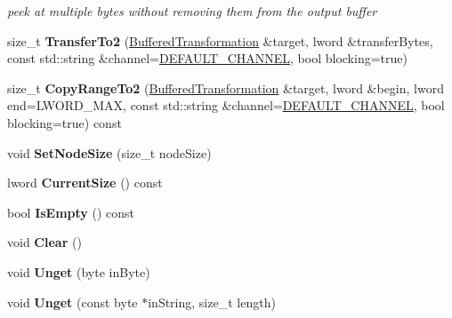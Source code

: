 \begin{DoxyCompactItemize}
\begin{DoxyCompactList}\small\item\em peek at multiple bytes without removing them from the output buffer \item\end{DoxyCompactList}\item 
\hypertarget{class_byte_queue_a9863db3b56bf42fb424f426afb7531cd}{
size\_\-t {\bfseries TransferTo2} (\hyperlink{class_buffered_transformation}{BufferedTransformation} \&target, lword \&transferBytes, const std::string \&channel=\hyperlink{cryptlib_8h_a6f1917f54ea8c2a45de6e08c5087c8de}{DEFAULT\_\-CHANNEL}, bool blocking=true)}
\label{class_byte_queue_a9863db3b56bf42fb424f426afb7531cd}

\item 
\hypertarget{class_byte_queue_a9a389914e2003ebb26516e4a6ad27c2c}{
size\_\-t {\bfseries CopyRangeTo2} (\hyperlink{class_buffered_transformation}{BufferedTransformation} \&target, lword \&begin, lword end=LWORD\_\-MAX, const std::string \&channel=\hyperlink{cryptlib_8h_a6f1917f54ea8c2a45de6e08c5087c8de}{DEFAULT\_\-CHANNEL}, bool blocking=true) const }
\label{class_byte_queue_a9a389914e2003ebb26516e4a6ad27c2c}

\item 
\hypertarget{class_byte_queue_a2e4f3d3759cf2ce54cbd1a193b1cefb6}{
void {\bfseries SetNodeSize} (size\_\-t nodeSize)}
\label{class_byte_queue_a2e4f3d3759cf2ce54cbd1a193b1cefb6}

\item 
\hypertarget{class_byte_queue_abe53cbc0c730b13c393e20ce6ccda577}{
lword {\bfseries CurrentSize} () const }
\label{class_byte_queue_abe53cbc0c730b13c393e20ce6ccda577}

\item 
\hypertarget{class_byte_queue_af44849c6d39bcdad5864dfd81ae5a122}{
bool {\bfseries IsEmpty} () const }
\label{class_byte_queue_af44849c6d39bcdad5864dfd81ae5a122}

\item 
\hypertarget{class_byte_queue_a2c305604a71571438aeb4c4e5e567c45}{
void {\bfseries Clear} ()}
\label{class_byte_queue_a2c305604a71571438aeb4c4e5e567c45}

\item 
\hypertarget{class_byte_queue_abdc94324169d07db16a246259c5ef86b}{
void {\bfseries Unget} (byte inByte)}
\label{class_byte_queue_abdc94324169d07db16a246259c5ef86b}

\item 
\hypertarget{class_byte_queue_a2d72210af03aea4ca132ed46d91b67e1}{
void {\bfseries Unget} (const byte $\ast$inString, size\_\-t length)}
\label{class_byte_queue_a2d72210af03aea4ca132ed46d91b67e1}


\end{DoxyCompactItemize}
